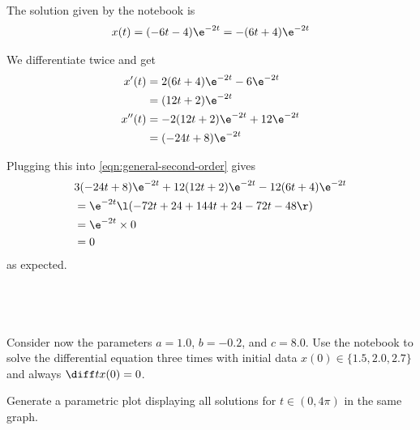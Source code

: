 \documentclass[a4paper]{article}
\begin{document}
The solution given by the notebook is \[
x(t) = (-6t - 4) \e^{-2t}
= -(6t + 4) \e^{-2t}
\]

We differentiate twice and get \begin{align*}
x'(t) &= 2(6t + 4) \e^{-2t} - 6 \e^{-2t} \\
&= (12t + 2) \e^{-2t} \\
x''(t) &= -2(12t + 2) \e^{-2t} + 12 \e^{-2t} \\
&= (-24t + 8) \e^{-2t}
\end{align*}

Plugging this into \eqref{eqn:general-second-order} gives \begin{align*}
& 3 (-24t + 8) \e^{-2t} + 12 (12t + 2) \e^{-2t} - 12 (6t + 4) \e^{-2t} \\
&= \e^{-2t} \l( -72t + 24 + 144t + 24 - 72t - 48 \r) \\
&= \e^{-2t} \times 0 \\
&= 0
\end{align*} as expected.

\subsection{~} %

\begin{questionbody}
Consider now the parameters $a = 1.0$, $b = −0.2$, and $c = 8.0$. Use the notebook to solve the differential equation three times with initial data $x(0) \in \{1.5, 2.0, 2.7\}$ and always $\diff t x(0) = 0$.

Generate a parametric plot displaying all solutions for $t \in (0, 4\pi)$ in the same graph.
\end{questionbody}
\end{document}
